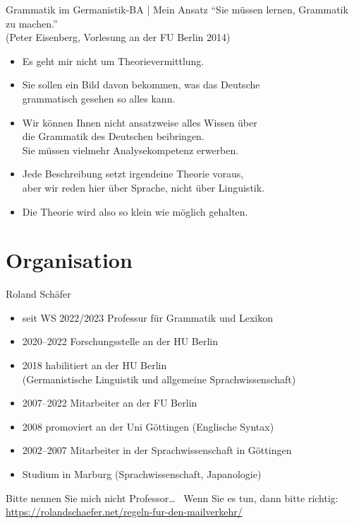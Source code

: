 
\begin{frame}
  {Grammatik im Germanistik-BA | Mein Ansatz}
  \onslide<+->
  \onslide<+->
  \alert{\Large "`Sie müssen lernen, Grammatik zu machen."'}\\
  (Peter Eisenberg, Vorlesung an der FU Berlin 2014)\\
  \Zeile
  \begin{itemize}[<+->]
    \item Es geht mir nicht um Theorievermittlung.
    \item Sie sollen ein Bild davon bekommen, was das Deutsche\\
      grammatisch gesehen so alles kann.
    \item Wir können Ihnen nicht ansatzweise alles Wissen über\\
      die Grammatik des Deutschen beibringen.\\
      Sie müssen vielmehr \alert{Analysekompetenz} erwerben.
    \item Jede Beschreibung setzt irgendeine Theorie voraus,\\
      aber \alert{wir reden hier über Sprache, nicht über Linguistik}.
    \item Die Theorie wird also so klein wie möglich gehalten.
  \end{itemize}
\end{frame}

\section{Organisation}

\begin{frame}
  {Roland Schäfer}
  \onslide<+->
  \begin{itemize}[<+->]
    \item seit WS 2022\slash 2023 Professur für Grammatik und Lexikon
    \item 2020--2022 Forschungsstelle an der HU Berlin
    \item 2018 habilitiert an der HU Berlin\\
      (Germanistische Linguistik und allgemeine Sprachwissenschaft)
    \item 2007--2022 Mitarbeiter an der FU Berlin
    \item 2008 promoviert an der Uni Göttingen (Englische Syntax)
    \item 2002--2007 Mitarbeiter in der Sprachwissenschaft in Göttingen
    \item Studium in Marburg (Sprachwissenschaft, Japanologie)
  \end{itemize}
  \Zeile
  \onslide<+->
  Bitte nennen Sie mich nicht Professor\ldots\ \onslide<+-> Wenn Sie es tun, dann bitte richtig:\\
  \url{https://rolandschaefer.net/regeln-fur-den-mailverkehr/}
\end{frame}

